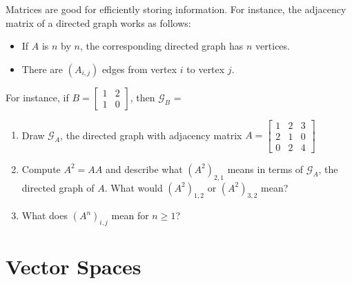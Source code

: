 \bq Matrices are good for efficiently storing information. For instance, the adjacency matrix of a directed graph works as follows:
\begin{itemize}
\item If $A$ is $n$ by $n$, the corresponding directed graph has $n$ vertices.
\item There are $(A_{i,j})$ edges from vertex $i$ to vertex $j$.
\end{itemize}
For instance, if $B = \left[ \begin{array}{ccc} 1 & 2 \\
                                    1 & 0 \end{array} \right] $, then $\mathcal G_B$ = \quad \quad {}
\begin{enumerate}
\item Draw $\mathcal G_A$, the directed graph with adjacency matrix $A = \left[ \begin{array}{ccc} 1 & 2 &3\\ 2& 1 & 0\\0 &2&4 \end{array} \right] $
\item Compute $A^2=AA$ and describe what $(A^2)_{2,1}$ means in terms of $\mathcal G_A$, the directed graph of $A$. What would $(A^2)_{1,2}$ or $(A^2)_{3,2}$ mean?
\item What does $(A^n)_{i,j}$ mean for $n \geq 1$?
\end{enumerate}
\eq

\chapter{Vector Spaces}

